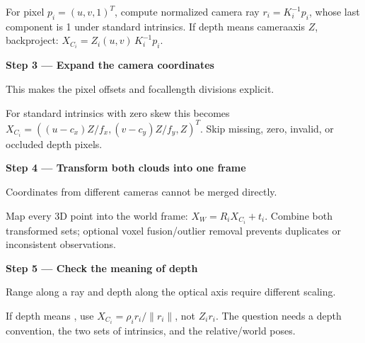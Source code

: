 \documentclass[letterpaper,11pt,english,openany,oneside]{jupyterBook}
\begin{document}
\sphinxAtStartPar
For pixel {\color{QuizMathBlue} \(p_i=(u,v,1)^T\)}, compute normalized camera ray {\color{QuizMathBlue} \(r_i=K_i^{-1}p_i\)}, whose last component is 1 under standard intrinsics. If depth means camera\sphinxhyphen{}axis {\color{QuizMathBlue} \(Z\)}, backproject: {\color{QuizMathBlue} \(\boxed{X_{C_i}=Z_i(u,v)\,K_i^{-1}p_i}\)}.

\par

\par\medskip{}
{\color{QuizStepRed}\bfseries Step 3 — Expand the camera coordinates}\par\smallskip

\sphinxAtStartPar
{} This makes the pixel offsets and focal\sphinxhyphen{}length divisions explicit.

\sphinxAtStartPar
For standard intrinsics with zero skew this becomes {\color{QuizMathBlue} \(X_{C_i}=((u-c_x)Z/f_x,(v-c_y)Z/f_y,Z)^T\)}. Skip missing, zero, invalid, or occluded depth pixels.

\par

\par\medskip{}
{\color{QuizStepRed}\bfseries Step 4 — Transform both clouds into one frame}\par\smallskip

\sphinxAtStartPar
{} Coordinates from different cameras cannot be merged directly.

\sphinxAtStartPar
Map every 3D point into the  world frame: {\color{QuizMathBlue} \(\boxed{X_W=R_iX_{C_i}+t_i}\)}. Combine both transformed sets; optional voxel fusion/outlier removal prevents duplicates or inconsistent observations.

\par

\par\medskip{}
{\color{QuizStepRed}\bfseries Step 5 — Check the meaning of depth}\par\smallskip

\sphinxAtStartPar
{} Range along a ray and depth along the optical axis require different scaling.

\sphinxAtStartPar
If depth means , use {\color{QuizMathBlue} \(X_{C_i}=\rho_i r_i/\|r_i\|\)}, not {\color{QuizMathBlue} \(Z_i r_i\)}. The question needs a depth convention, the two sets of intrinsics, and the relative/world poses.
\end{document}
